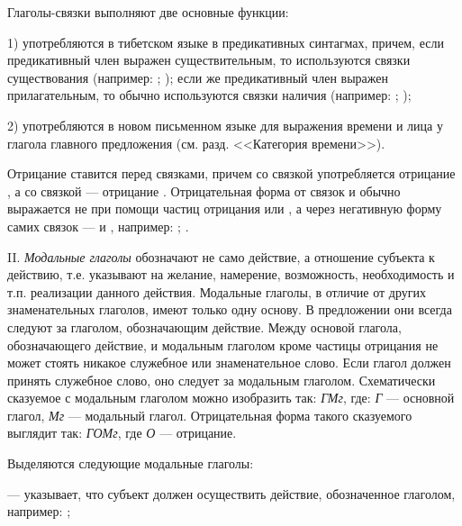Глаголы-связки выполняют две основные функции:

1) употребляются в тибетском языке в предикативных синтагмах, причем, если предикативный член выражен существительным, то используются связки существования
(например: ;
);
если же предикативный член выражен прилагательным, то обычно используются связки наличия (например: ;
);

2) употребляются в новом письменном языке для выражения времени и лица у глагола главного предложения (см. разд. <<Категория времени>>).

Отрицание ставится перед связками, причем со связкой  употребляется отрицание , а со связкой  --- отрицание . Отрицательная форма от связок  и  обычно выражается не при помощи частиц отрицания  или , а через негативную форму самих связок ---  и , например:
;
.

II. \emph{Модальные глаголы} обозначают не само действие, а отношение субъекта к действию, т.е. указывают на желание, намерение, возможность, необходимость и т.п. реализации данного действия. Модальные глаголы, в отличие от других знаменательных глаголов, имеют только одну основу. В предложении они всегда следуют за глаголом, обозначающим действие. Между основой глагола, обозначающего действие, и модальным глаголом кроме частицы отрицания не может стоять никакое служебное или знаменательное слово. Если глагол должен принять служебное слово, оно следует за модальным глаголом. Схематически сказуемое с модальным глаголом можно изобразить так: \emph{ГМг}, где: \emph{Г} --- основной глагол, \emph{Мг} --- модальный глагол. Отрицательная форма такого сказуемого выглядит так: \emph{ГОМг}, где \emph{О} --- отрицание.

Выделяются следующие модальные глаголы:

 --- указывает, что субъект должен осуществить действие, обозначенное глаголом, например:
;

